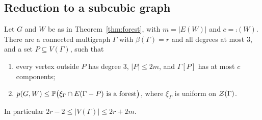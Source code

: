 \subsection{Reduction to a subcubic graph}

\begin{lemma}\label{lem:reduce}
Let $G$ and $W$ be as in Theorem~\ref{thm:forest}, with $m=|E(W)|$ and $c=\comp(W)$. There are a
connected multigraph $\Gamma$ with $\beta(\Gamma)=r$ and all degrees at most $3$, and a set
$P\subseteq V(\Gamma)$, such that
\begin{enumerate}
\item[\textup{(i)}] every vertex outside $P$ has degree $3$, $|P|\le2m$, and $\Gamma[P]$ has at
most $c$ components;
\item[\textup{(ii)}] $p(G,W)\le\mathbb{P}\bigl(\xi_\Gamma\cap E(\Gamma-P)\text{ is a forest}\bigr)$, where
$\xi_\Gamma$ is uniform on $\mathcal{Z}(\Gamma)$.
\end{enumerate}
In particular $2r-2\le|V(\Gamma)|\le2r+2m$.
\end{lemma}

